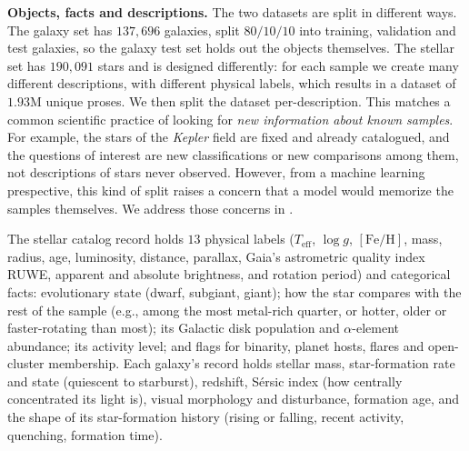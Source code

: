 
\textbf{Objects, facts and descriptions.} The two datasets are split in
different ways. The galaxy
set has $137{,}696$ galaxies, split $80/10/10$ into training, validation and
test galaxies, so the galaxy test set holds out the objects themselves. The stellar set has $190{,}091$ stars and is designed differently:
for each sample we create many different descriptions, with different physical labels,
which results in a dataset of $1.93$M unique
proses. We then split the dataset per-description.
This matches a common scientific practice of looking for 
\emph{new information about known samples}. For example, the stars of the \emph{Kepler} field are
fixed and already catalogued, and the
questions of interest are new classifications or new comparisons among them, not descriptions of stars
never observed. However, from a machine learning prespective, this kind of split raises a concern
that a model would memorize
the samples themselves. We address those concerns in .

The stellar catalog record holds $13$ physical labels ($T_\mathrm{eff}$, $\log g$,
$[\mathrm{Fe/H}]$, mass, radius, age, luminosity, distance, parallax, Gaia's
astrometric quality index RUWE, apparent and absolute brightness, and rotation
period) and categorical facts: evolutionary state (dwarf, subgiant, giant); how
the star compares with the rest of the sample (e.g., among the most metal-rich
quarter, or hotter, older or faster-rotating than most); its Galactic disk
population and $\alpha$-element abundance; its activity level; and flags for
binarity, planet hosts, flares and open-cluster membership. Each galaxy's record
holds stellar mass, star-formation rate and state (quiescent to starburst),
redshift, S\'ersic index (how centrally concentrated its light is), visual
morphology and disturbance, formation age, and the shape of its star-formation
history (rising or falling, recent activity, quenching, formation time).

